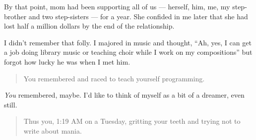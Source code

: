 By that point, mom had been supporting all of us --- herself, him, me, my step-brother and two step-sisters --- for a year. She confided in me later that she had lost half a million dollars by the end of the relationship.

I didn't remember that folly. I majored in music and thought, ``Ah, yes, I can get a job doing library music or teaching choir while I work on my compositions'' but forgot how lucky he was when I met him.

\begin{quote}
You remembered and raced to teach yourself programming.
\end{quote}

\emph{You} remembered, maybe. I'd like to think of myself as a bit of a dreamer, even still.

\begin{quote}
Thus you, 1:19 AM on a Tuesday, gritting your teeth and trying not to write about mania.
\end{quote}
